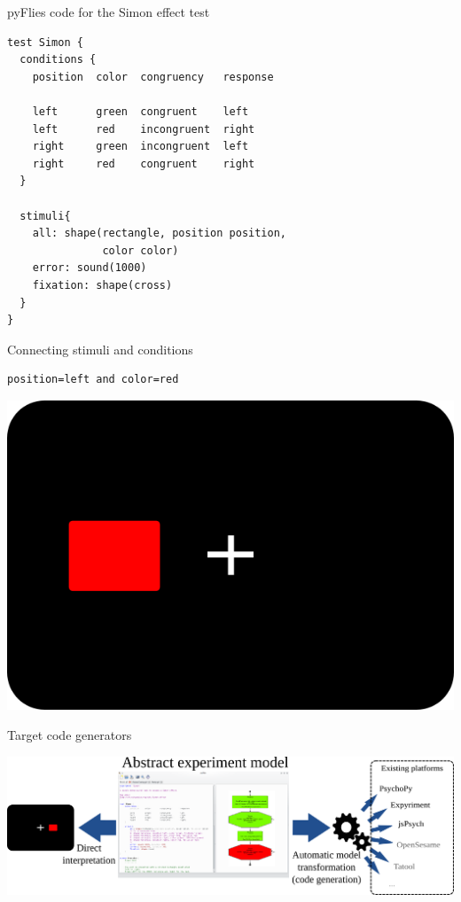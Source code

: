 \documentclass[presentation]{beamer}
\begin{document}
\begin{frame}[label={sec:orgcefe970},fragile]{pyFlies code for the Simon effect test}
 \begin{verbatim}
test Simon {
  conditions {
    position  color  congruency   response

    left      green  congruent    left
    left      red    incongruent  right
    right     green  incongruent  left
    right     red    congruent    right
  }

  stimuli{
    all: shape(rectangle, position position,
               color color)
    error: sound(1000)
    fixation: shape(cross)
  }
}
\end{verbatim}
\end{frame}
\begin{frame}[label={sec:orgaad72a3},fragile]{Connecting stimuli and conditions}
 \begin{verbatim}
position=left and color=red
\end{verbatim}

\begin{center}
\includegraphics[width=.9\linewidth]{./images/stimuli-conditions.png}
\end{center}
\end{frame}


\begin{frame}[label={sec:org4949300}]{Target code generators}
\begin{center}
\includegraphics[width=1\textwidth]{./images/architecture.png}
\end{center} 
\end{frame}
\end{document}
